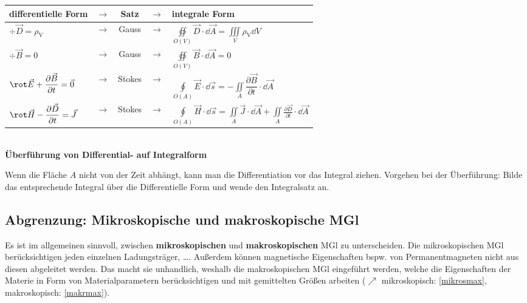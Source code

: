   \begin{center} 
	  \begin{tabular}{l c c c l}
		  differentielle Form                                            & $\to$ & Satz   & $\to$ & integrale Form                                                                                                                                                                                 \\
		  \hline
		  $\div \vec{D}= \rho_{\text{V}}$                                & $\to$ & Gauss  & $\to$ & $\oiint\limits_{O(V)}\vec{D}\cdot\dd\vec{A}= \iiint\limits_{V}\rho_{\text{V}}\dd V$                                                                                                            \\
		  $\div \vec{B}= 0$                                              & $\to$ & Gauss  & $\to$ & $\oiint\limits_{O(V)}\vec{B}\cdot \dd\vec{A}= 0$                                                                                                                                               \\
		  $\rot \vec{E}+ \dfrac{\partial \vec{B} }{\partial t}=\vec{0}$  & $\to$ & Stokes & $\to$ & $\oint\limits_{O(A)}\vec{E}\cdot \dd\vec{s}= - \iint\limits_{A}\dfrac{\partial \vec{B} }{\partial t}\cdot\dd\vec{A}$ \\
		  $\rot \vec{H}- \dfrac{\partial \vec{D} }{\partial t}= \vec{J}$ & $\to$ & Stokes & $\to$ & $\oint\limits_{O(A)}\vec{H}\cdot \dd\vec{s}= \iint\limits_{A}\vec{J}\cdot\dd \vec{A} +  \iint\limits_{A}\frac{\partial\vec{D}}{\partial t}\cdot\dd\vec{A}$
	  \end{tabular}\\
	  {\textbf{Überführung von Differential- auf Integralform}}
  \end{center}
  Wenn die Fläche $A$ nicht von der Zeit abhängt, kann man die Differentiation vor das Integral ziehen. Vorgehen bei der Überführung: Bilde das entsprechende Integral über die Differentielle Form und wende den Integralsatz an.
  \subsection{Abgrenzung: Mikroskopische und makroskopische MGl}
  Es ist im allgemeinen sinnvoll, zwischen \textbf{mikroskopischen} und \textbf{makroskopischen} MGl zu unterscheiden. Die mikroskopischen MGl berücksichtigen jeden einzelnen Ladungsträger, \dots. Außerdem können magnetische Eigenschaften bspw. von Permanentmagneten nicht aus diesen abgeleitet werden. Das macht sie unhandlich, weshalb die makroskopischen MGl eingeführt werden, welche die Eigenschaften der Materie in Form von Materialparametern berücksichtigen und mit gemittelten Größen arbeiten ($\nearrow$ mikroskopisch: \ref{mikrosmax}, makroskopisch: \ref{makrmax}).
